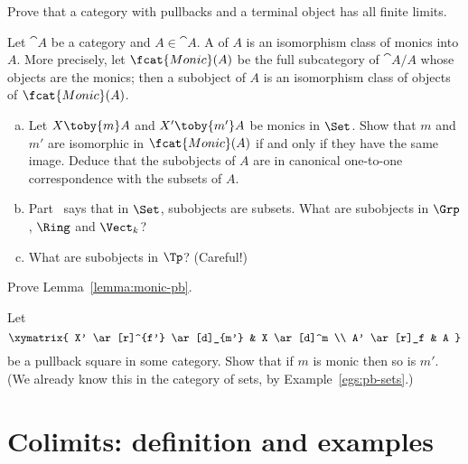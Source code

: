 \begin{question}
Prove that a category with pullbacks%
%
%
and a terminal object has all finite limits.
\end{question}


\begin{question}        
\label{ex:subobjects}
Let $\cat{A}$ be a category and $A \in \cat{A}$.  A %
%
%
of $A$ is an isomorphism class of monics into $A$.  More precisely, let
$\fcat{Monic}(A)$ be the full subcategory of $\cat{A}/A$ whose objects are
the monics; then a subobject of $A$ is an isomorphism class of objects of
$\fcat{Monic}(A)$.
% 
\begin{enumerate}[(b)]
\item   
\label{part:sub-Set}
Let $X \toby{m} A$ and $X' \toby{m'} A$ be monics in $\Set$.  Show that
$m$ and $m'$ are isomorphic in $\fcat{Monic}(A)$ if and only if they have
the same image.  Deduce that the subobjects of $A$ are in canonical
one-to-one correspondence with the subsets%
%
%
of $A$.

\item 
Part~ says that in $\Set$, subobjects are subsets.
What are subobjects in $\Grp$, $\Ring$ and $\Vect_k$?  

\item
What are subobjects in $\Tp$?  (Careful!)
\end{enumerate}
\end{question}


\begin{question}        
\label{ex:monic-pb}
Prove Lemma~\ref{lemma:monic-pb}.
\end{question}


\begin{question}        
\label{ex:pb-monic}
Let
\[
\xymatrix{
X' \ar[r]^{f'} \ar[d]_{m'}      &
X \ar[d]^m      \\
A' \ar[r]_f     &
A
}
%
\index{pullback!monic@of monic}%
\index{monic!pullback of}
%
\]
be a pullback square in some category.  Show that if $m$ is monic then so
is $m'$.  (We already know this in the category of sets, by
Example~\ref{egs:pb-sets}.)
\end{question}



\section{Colimits: definition and examples}


